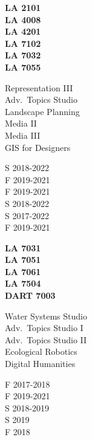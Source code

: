 \documentclass[10pt]{developercv} %
\begin{document}


\begin{minipage}[t]{0.1\textwidth} 
\textbf{LA 2101}\\
\textbf{LA 4008}\\
\textbf{LA 4201}\\
\textbf{LA 7102}\\
\textbf{LA 7032}\\
\textbf{LA 7055}\\
\end{minipage}
\begin{minipage}[t]{0.2\textwidth} 
Representation III\\
Adv.~Topics Studio\\
Landscape Planning \\
Media II \\
Media III\\
GIS for Designers\\
\end{minipage}
\begin{minipage}[t]{0.2\textwidth} 
S 2018-2022\\
F 2019-2021\\
F 2019-2021\\
S 2018-2022\\
S 2017-2022\\
F 2019-2021\\
\end{minipage}
\begin{minipage}[t]{0.15\textwidth} 
\textbf{LA 7031}\\
\textbf{LA 7051}\\
\textbf{LA 7061}\\
\textbf{LA 7504}\\
\textbf{DART 7003}\\
\end{minipage}
\begin{minipage}[t]{0.2\textwidth} 
Water Systems Studio\\
Adv.~Topics Studio I\\
Adv.~Topics Studio II\\
Ecological Robotics\\
Digital Humanities\\
\end{minipage}
\begin{minipage}[t]{0.15\textwidth} 
F 2017-2018\\
F 2019-2021\\
S 2018-2019\\
S 2019\\
F 2018\\
\end{minipage}
\end{document}
